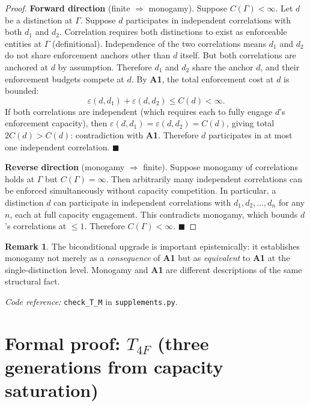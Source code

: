 \documentclass[11pt]{article}
\newcommand{\coderef}[2]{\smallskip\noindent\textit{Code reference:} \texttt{#1} in \texttt{#2}.}
\newcommand{\Aone}{\textbf{A1}}
\theoremstyle{definition}
\newtheorem{remark}[theorem]{Remark}
\begin{document}
\begin{proof}
\textbf{Forward direction} (finite $\Rightarrow$ monogamy). Suppose $C(\Gamma) < \infty$. Let $d$ be a distinction at $\Gamma$. Suppose $d$ participates in independent correlations with both $d_1$ and $d_2$. Correlation requires both distinctions to exist as enforceable entities at $\Gamma$ (definitional). Independence of the two correlations means $d_1$ and $d_2$ do not share enforcement anchors other than $d$ itself. But both correlations are anchored at $d$ by assumption. Therefore $d_1$ and $d_2$ share the anchor $d$, and their enforcement budgets compete at $d$. By \Aone{}, the total enforcement cost at $d$ is bounded:
\[
\varepsilon(d, d_1) + \varepsilon(d, d_2) \leq C(d) < \infty.
\]
If both correlations are independent (which requires each to fully engage $d$'s enforcement capacity), then $\varepsilon(d, d_1) = \varepsilon(d, d_2) = C(d)$, giving total $2 C(d) > C(d)$: contradiction with \Aone{}. Therefore $d$ participates in at most one independent correlation. $\blacksquare$

\textbf{Reverse direction} (monogamy $\Rightarrow$ finite). Suppose monogamy of correlations holds at $\Gamma$ but $C(\Gamma) = \infty$. Then arbitrarily many independent correlations can be enforced simultaneously without capacity competition. In particular, a distinction $d$ can participate in independent correlations with $d_1, d_2, \ldots, d_n$ for any $n$, each at full capacity engagement. This contradicts monogamy, which bounds $d$'s correlations at $\leq 1$. Therefore $C(\Gamma) < \infty$. $\blacksquare$
\end{proof}

\begin{remark}
The biconditional upgrade is important epistemically: it establishes monogamy not merely as a \emph{consequence} of \Aone{} but as \emph{equivalent} to \Aone{} at the single-distinction level. Monogamy and \Aone{} are different descriptions of the same structural fact.
\end{remark}

\coderef{check\_T\_M}{supplements.py}

\clearpage

\section{Formal proof: \texorpdfstring{$T_{4F}$}{T4F} (three generations from capacity saturation)}\label{sec:T4F_full}
\end{document}
